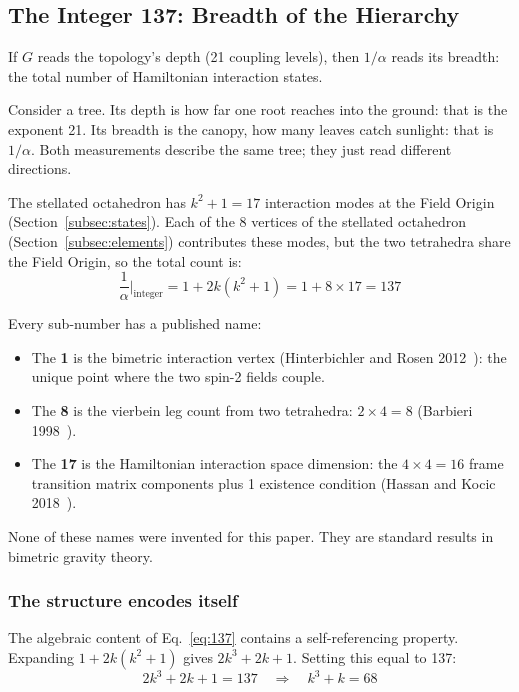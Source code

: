 \documentclass[aps,prd,preprint,superscriptaddress,showpacs,preprintnumbers,amsmath,amssymb,nofootinbib]{revtex4-2}
\begin{document}
\subsection{The Integer 137: Breadth of the Hierarchy}
\label{subsec:breadth}

If $G$ reads the topology's depth (21 coupling levels), then $1/\alpha$ reads its breadth: the total number of Hamiltonian interaction states.

Consider a tree. Its depth is how far one root reaches into the ground: that is the exponent 21. Its breadth is the canopy, how many leaves catch sunlight: that is $1/\alpha$. Both measurements describe the same tree; they just read different directions.

The stellated octahedron has $k^2 + 1 = 17$ interaction modes at the Field Origin (Section~\ref{subsec:states}). Each of the 8 vertices of the stellated octahedron (Section~\ref{subsec:elements}) contributes these modes, but the two tetrahedra share the Field Origin, so the total count is:
\begin{equation}
\frac{1}{\alpha}\bigg|_{\text{integer}} = 1 + 2k(k^2 + 1) = 1 + 8 \times 17 = 137
\label{eq:137}
\end{equation}

Every sub-number has a published name:
\begin{itemize}
\item The \textbf{1} is the bimetric interaction vertex (Hinterbichler and Rosen 2012~\cite{hinterbichler2012}): the unique point where the two spin-2 fields couple.
\item The \textbf{8} is the vierbein leg count from two tetrahedra: $2 \times 4 = 8$ (Barbieri 1998~\cite{barbieri1998}).
\item The \textbf{17} is the Hamiltonian interaction space dimension: the $4 \times 4 = 16$ frame transition matrix components plus 1 existence condition (Hassan and Kocic 2018~\cite{hassankocic2018}).
\end{itemize}

None of these names were invented for this paper. They are standard results in bimetric gravity theory.

\subsubsection*{The structure encodes itself}

The algebraic content of Eq.~\eqref{eq:137} contains a self-referencing property. Expanding $1 + 2k(k^2 + 1)$ gives $2k^3 + 2k + 1$. Setting this equal to 137:
\begin{equation}
2k^3 + 2k + 1 = 137 \quad \Longrightarrow \quad k^3 + k = 68
\end{equation}
\end{document}
